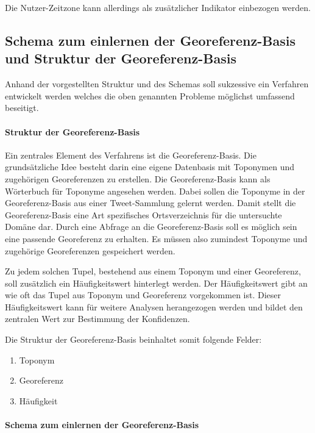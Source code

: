 				Die Nutzer-Zeitzone kann allerdings als zusätzlicher Indikator einbezogen werden.


				\subsection{Schema zum einlernen der Georeferenz-Basis und Struktur der Georeferenz-Basis}			
					
					Anhand der vorgestellten Struktur und des Schemas soll sukzessive ein Verfahren entwickelt werden welches die oben genannten Probleme möglichst umfassend beseitigt. 


					\paragraph{Struktur der Georeferenz-Basis} 
						Ein zentrales Element des Verfahrens ist die Georeferenz-Basis.  
					 	Die grundsätzliche Idee besteht darin eine eigene Datenbasis mit Toponymen und zugehörigen Georeferenzen zu erstellen.
						Die Georeferenz-Basis kann als Wörterbuch für Toponyme angesehen werden.
						Dabei sollen die Toponyme in der Georeferenz-Basis aus einer Tweet-Sammlung gelernt werden.
						Damit stellt die Georeferenz-Basis eine Art spezifisches Ortsverzeichnis für die untersuchte Domäne dar.
						Durch eine Abfrage an die Georeferenz-Basis soll es möglich sein eine passende Georeferenz zu erhalten.
						Es müssen also zumindest Toponyme und zugehörige Georeferenzen gespeichert werden.

						Zu jedem solchen Tupel, bestehend aus einem Toponym und einer Georeferenz, soll zusätzlich ein Häufigkeitswert hinterlegt werden.
						Der Häufigkeitswert gibt an wie oft das Tupel aus Toponym und Georeferenz vorgekommen ist.
						Dieser Häufigkeitswert kann für weitere Analysen herangezogen werden und bildet den zentralen Wert zur Bestimmung der Konfidenzen. 

						Die Struktur der Georeferenz-Basis beinhaltet somit folgende Felder:

						\begin{enumerate}
							\item Toponym
							\item Georeferenz  
							\item Häufigkeit 
						\end{enumerate}

					\paragraph{Schema zum einlernen der Georeferenz-Basis}
						
